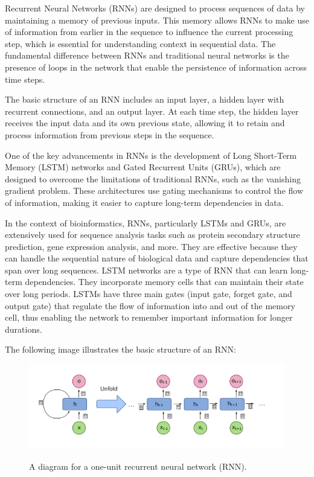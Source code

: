 Recurrent Neural Networks (RNNs) are designed to process sequences of data by maintaining a memory of previous inputs. This memory allows RNNs to make use of information from earlier in the sequence to influence the current processing step, which is essential for understanding context in sequential data. The fundamental difference between RNNs and traditional neural networks is the presence of loops in the network that enable the persistence of information across time steps.

The basic structure of an RNN includes an input layer, a hidden layer with recurrent connections, and an output layer. At each time step, the hidden layer receives the input data and its own previous state, allowing it to retain and process information from previous steps in the sequence.

One of the key advancements in RNNs is the development of Long Short-Term Memory (LSTM) networks and Gated Recurrent Units (GRUs), which are designed to overcome the limitations of traditional RNNs, such as the vanishing gradient problem. These architectures use gating mechanisms to control the flow of information, making it easier to capture long-term dependencies in data.

In the context of bioinformatics, RNNs, particularly LSTMs and GRUs, are extensively used for sequence analysis tasks such as protein secondary structure prediction, gene expression analysis, and more. They are effective because they can handle the sequential nature of biological data and capture dependencies that span over long sequences. LSTM networks are a type of RNN that can learn long-term dependencies. They incorporate memory cells that can maintain their state over long periods. LSTMs have three main gates (input gate, forget gate, and output gate) that regulate the flow of information into and out of the memory cell, thus enabling the network to remember important information for longer durations. \autocite{hochreiterLongShortTermMemory1997}

The following image illustrates the basic structure of an RNN:

\begin{figure}[hbt]
    \centering
    \begin{minipage}[t]{\textwidth}
    \caption{A diagram for a one-unit recurrent neural network (RNN).}
    \includegraphics[width=1\textwidth]{img/Recurrent Neural Network Unfold.png}\\
    \label{fig:RNN}
    \end{minipage}
\end{figure}

